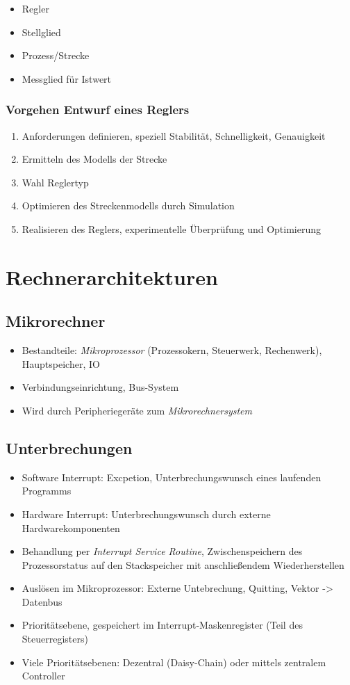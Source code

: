 \begin{itemize}
	\item Regler
	\item Stellglied
	\item Prozess/Strecke
	\item Messglied für Istwert
\end{itemize}

\subsubsection{Vorgehen Entwurf eines Reglers}
\begin{enumerate}
	\item Anforderungen definieren, speziell Stabilität, Schnelligkeit, Genauigkeit
	\item Ermitteln des Modells der Strecke
	\item Wahl Reglertyp
	\item Optimieren des Streckenmodells durch Simulation
	\item Realisieren des Reglers, experimentelle Überprüfung und Optimierung
\end{enumerate}



\section{Rechnerarchitekturen}

\subsection{Mikrorechner}
\begin{itemize}
	\item Bestandteile: \textit{Mikroprozessor} (Prozessokern, Steuerwerk, Rechenwerk), Hauptspeicher, IO
	\item Verbindungseinrichtung, Bus-System
	\item Wird durch Peripheriegeräte zum \textit{Mikrorechnersystem}
\end{itemize}


\subsection{Unterbrechungen}
\begin{itemize}
	\item Software Interrupt: Excpetion, Unterbrechungswunsch eines laufenden Programms
	\item Hardware Interrupt: Unterbrechungswunsch durch externe Hardwarekomponenten
	\item Behandlung per \textit{Interrupt Service Routine}, Zwischenspeichern des Prozessorstatus auf den Stackspeicher mit anschließendem Wiederherstellen
	\item Auslösen im Mikroprozessor: Externe Untebrechung, Quitting, Vektor -> Datenbus
	\item Prioritätsebene, gespeichert im Interrupt-Maskenregister (Teil des Steuerregisters)
	\item Viele Prioritätsebenen: Dezentral (Daisy-Chain) oder mittels zentralem Controller
\end{itemize}



